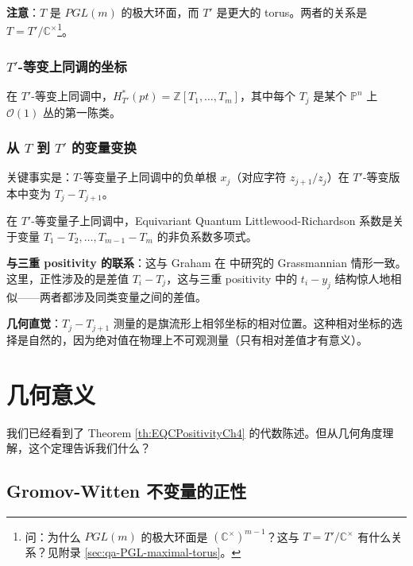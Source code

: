 \textbf{注意}：$T$ 是 $PGL(m)$ 的极大环面，而 $T'$ 是更大的 torus。两者的关系是 $T = T'/\mathbb{C}^\times$\footnote{问：为什么 $PGL(m)$ 的极大环面是 $(\mathbb{C}^{\times})^{m-1}$？这与 $T = T'/\mathbb{C}^\times$ 有什么关系？见附录 \cref{sec:qa-PGL-maximal-torus}。}。

\subsubsection{$T'$-等变上同调的坐标}

在 $T'$-等变上同调中，$H_{T'}^*(pt) = \mathbb{Z}[T_1, \ldots, T_m]$，其中每个 $T_j$ 是某个 $\mathbb{P}^n$ 上 $\mathcal{O}(1)$ 丛的第一陈类。

\subsubsection{从 $T$ 到 $T'$ 的变量变换}

关键事实是：$T$-等变量子上同调中的负单根 $x_j$（对应字符 $z_{j+1}/z_j$）在 $T'$-等变版本中变为 $T_j - T_{j+1}$。

\begin{Corollary}
\label{cor:TdashPositivity}
在 $T'$-等变量子上同调中，Equivariant Quantum Littlewood-Richardson 系数是关于变量 $T_1 - T_2, \ldots, T_{m-1} - T_m$ 的非负系数多项式。
\end{Corollary}

\textbf{与三重 positivity 的联系}：这与 Graham 在 \cite{knutson2005} 中研究的 Grassmannian 情形一致。这里，正性涉及的是差值 $T_i - T_j$，这与三重 positivity 中的 $t_i - y_j$ 结构惊人地相似——两者都涉及同类变量之间的差值。

\textbf{几何直觉}：$T_j - T_{j+1}$ 测量的是旗流形上相邻坐标的相对位置。这种相对坐标的选择是自然的，因为绝对值在物理上不可观测量（只有相对差值才有意义）。

\section{几何意义}
\label{sec:GeometricMeaningCh4}

我们已经看到了 Theorem \cref{th:EQCPositivityCh4} 的代数陈述。但从几何角度理解，这个定理告诉我们什么？

\subsection{Gromov-Witten 不变量的正性}

